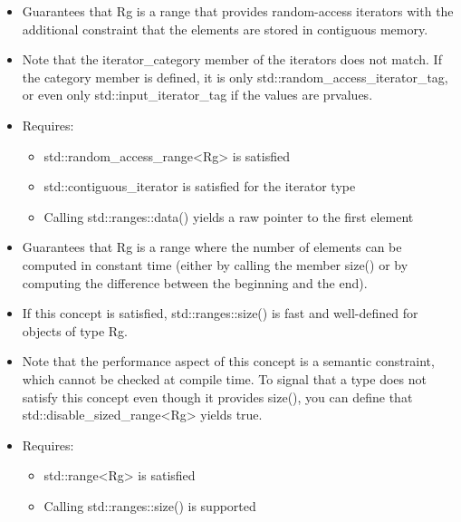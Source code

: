 \begin{itemize}
\item
Guarantees that Rg is a range that provides random-access iterators with the additional constraint that the elements are stored in contiguous memory.

\item
Note that the iterator\_category member of the iterators does not match. If the category member is defined, it is only std::random\_access\_iterator\_tag, or even only std::input\_iterator\_tag if the values are prvalues.

\item
Requires:

\begin{itemize}
\item
std::random\_access\_range<Rg> is satisfied

\item
std::contiguous\_iterator is satisfied for the iterator type

\item
Calling std::ranges::data() yields a raw pointer to the first element
\end{itemize}
\end{itemize}


\begin{itemize}
\item
Guarantees that Rg is a range where the number of elements can be computed in constant time (either by calling the member size() or by computing the difference between the beginning and the end).

\item
If this concept is satisfied, std::ranges::size() is fast and well-defined for objects of type Rg.

\item
Note that the performance aspect of this concept is a semantic constraint, which cannot be checked at compile time. To signal that a type does not satisfy this concept even though it provides size(), you can define that std::disable\_sized\_range<Rg> yields true.

\item
Requires:

\begin{itemize}
\item
std::range<Rg> is satisfied

\item
Calling std::ranges::size() is supported
\end{itemize}
\end{itemize}

